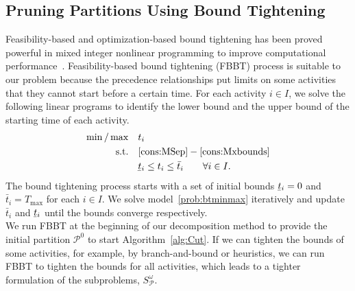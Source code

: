 \documentclass[11pt]{article}
\renewcommand{\underbar}{\underaccent{\bar}}
\begin{document}
	\subsection{Pruning Partitions Using Bound Tightening} \label{subsec:FBBT}
	Feasibility-based and optimization-based bound tightening has been proved powerful in mixed integer nonlinear programming to improve computational performance~\cite{belotti2012fbbt,coffrin2015strengthening,sundar2018OBBT}. Feasibility-based bound tightening (FBBT) process is suitable to our problem because the precedence relationships put limits on some activities that they cannot start before a certain time. For each activity \(i \in I\), we solve the following linear programs to identify the lower bound and the upper bound of the starting time of each activity. 
	\begin{subequations} \label{prob:btminmax}
		\begin{align}
		\min/\max \quad & t_i \\
		\text{s.t.} \quad & \eqref{cons:MSep} - \eqref{cons:Mxbounds}\\
		& \underbar{t}_i \leq t_i \leq \bar{t}_i \qquad \forall i \in I.
		\end{align}
	\end{subequations}
	The bound tightening process starts with a set of initial bounds \(\underbar{t}_i = 0\) and \(\bar{t}_i = T_{\max}\) for each \(i \in I\). We solve model~\eqref{prob:btminmax} iteratively and update \(\bar{t}_i\) and \(\underbar{t}_i\) until the bounds converge respectively.\\
	\newline
	We run FBBT at the beginning of our decomposition method to provide the initial partition \(\mathcal{P}^0\) to start Algorithm~\ref{alg:Cut}. If we can tighten the bounds of some activities, for example, by branch-and-bound or heuristics, we can run FBBT to tighten the bounds for all activities, which leads to a tighter formulation of the subproblems, \(S^{\omega}_{\mathcal{P}}\). \\
	
\end{document}

